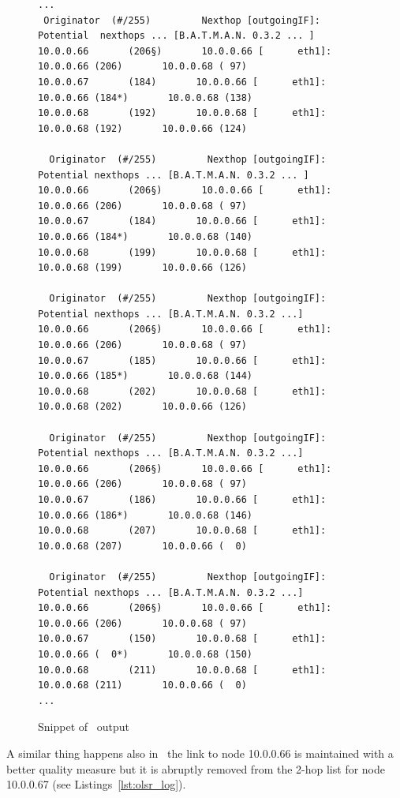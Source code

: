 \begin{figure}[tbhp]
\begin{Verbatim}[fontsize=\footnotesize]
...
 Originator  (#/255)         Nexthop [outgoingIF]:   Potential  nexthops ... [B.A.T.M.A.N. 0.3.2 ... ]
10.0.0.66       (206§)       10.0.0.66 [      eth1]:       10.0.0.66 (206)       10.0.0.68 ( 97)
10.0.0.67       (184)       10.0.0.66 [      eth1]:       10.0.0.66 (184*)       10.0.0.68 (138)
10.0.0.68       (192)       10.0.0.68 [      eth1]:       10.0.0.68 (192)       10.0.0.66 (124)

  Originator  (#/255)         Nexthop [outgoingIF]:   Potential nexthops ... [B.A.T.M.A.N. 0.3.2 ... ]
10.0.0.66       (206§)       10.0.0.66 [      eth1]:       10.0.0.66 (206)       10.0.0.68 ( 97)
10.0.0.67       (184)       10.0.0.66 [      eth1]:       10.0.0.66 (184*)       10.0.0.68 (140)
10.0.0.68       (199)       10.0.0.68 [      eth1]:       10.0.0.68 (199)       10.0.0.66 (126)

  Originator  (#/255)         Nexthop [outgoingIF]:   Potential nexthops ... [B.A.T.M.A.N. 0.3.2 ...]
10.0.0.66       (206§)       10.0.0.66 [      eth1]:       10.0.0.66 (206)       10.0.0.68 ( 97)
10.0.0.67       (185)       10.0.0.66 [      eth1]:       10.0.0.66 (185*)       10.0.0.68 (144)
10.0.0.68       (202)       10.0.0.68 [      eth1]:       10.0.0.68 (202)       10.0.0.66 (126)

  Originator  (#/255)         Nexthop [outgoingIF]:   Potential nexthops ... [B.A.T.M.A.N. 0.3.2 ...]
10.0.0.66       (206§)       10.0.0.66 [      eth1]:       10.0.0.66 (206)       10.0.0.68 ( 97)
10.0.0.67       (186)       10.0.0.66 [      eth1]:       10.0.0.66 (186*)       10.0.0.68 (146)
10.0.0.68       (207)       10.0.0.68 [      eth1]:       10.0.0.68 (207)       10.0.0.66 (  0)

  Originator  (#/255)         Nexthop [outgoingIF]:   Potential nexthops ... [B.A.T.M.A.N. 0.3.2 ...]
10.0.0.66       (206§)       10.0.0.66 [      eth1]:       10.0.0.66 (206)       10.0.0.68 ( 97)
10.0.0.67       (150)       10.0.0.68 [      eth1]:       10.0.0.66 (  0*)       10.0.0.68 (150)
10.0.0.68       (211)       10.0.0.68 [      eth1]:       10.0.0.68 (211)       10.0.0.66 (  0)
...
\end{Verbatim}
\caption{Snippet of \batman\ output}
\label{lst:batman_log}
\end{figure}

A similar thing happens also in \olsr\ the link to node 10.0.0.66 is
maintained with a better quality measure but it is abruptly removed
from the 2-hop list for node 10.0.0.67 (see Listings~\ref{lst:olsr_log}).

